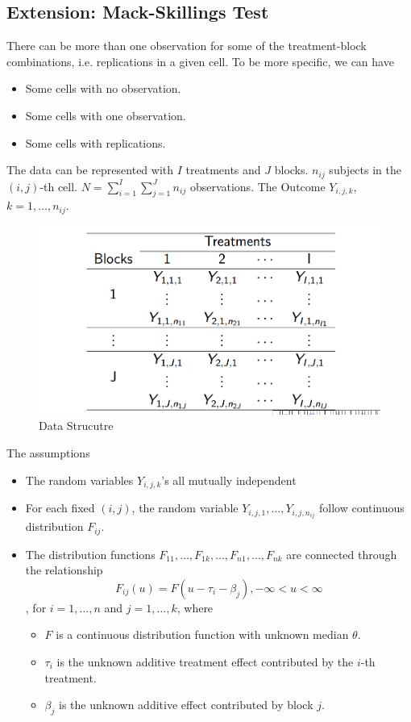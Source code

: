 \subsection{Extension: Mack-Skillings Test}
There can be more than one observation for some of the treatment-block combinations, i.e. replications in a given cell. To be more specific, we can have 
\begin{itemize}
	\item Some cells with no observation.
	\item Some cells with one observation.
	\item Some cells with replications.
\end{itemize}

The data can be represented with $I$ treatments and $J$ blocks. $n_{ij}$ subjects in the $(i, j)$-th cell. $N = \sum_{i=1}^{I} \sum_{j=1}^{J} n_{ij}$ observations. The Outcome $Y_{i,j,k}$, $k = 1, \dots, n_{ij}$.
\begin{figure}[H]
	\centering
	\includegraphics[width=0.7\linewidth]{fig/skillings-mack-data}
	\caption{Data Strucutre}
	\label{fig:skillings-mack-data}
\end{figure}

The assumptions
\begin{itemize}
	\item The random variables $Y_{i,j,k}$'s all mutually independent
	\item For each fixed $(i, j)$, the random variable $Y_{i,j,1}, \dots, Y_{i,j,n_{ij}}$ follow continuous distribution $F_{ij}$.
	\item The distribution functions $F_{11}, \dots, F_{1k}, \dots, F_{n1}, \dots, F_{nk}$ are connected through the relationship
	\[F_{ij}(u) = F(u - \tau_i - \beta_j ), -\infty < u < \infty\]
	, for $i = 1, \dots, n$ and $j = 1, \dots, k$, where
	\begin{itemize}
		\item $F$ is a continuous distribution function with unknown median $\theta$.
		\item $\tau_i$ is the unknown additive treatment effect contributed by the $i$-th treatment.
		\item $\beta_j$ is the unknown additive effect contributed by block $j$.
	\end{itemize}
\end{itemize} 


